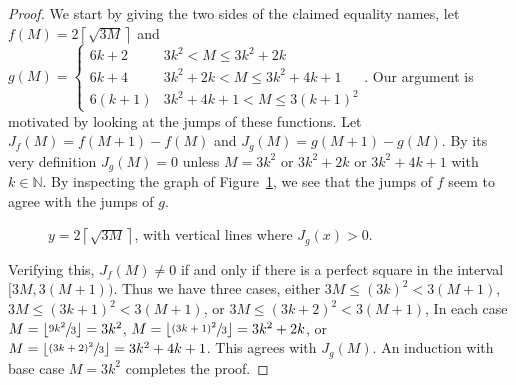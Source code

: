 \documentclass[10pt,a4paper]{amsart}
\newcommand{\David}[1]{\textcolor{red}{[David] #1}}
\newcommand{\M}{\mathcal{M}}
\newcommand{\N}{\mathbb{N}}
\newcommand{\ceil}[1]{\left\lceil #1 \right\rceil}
\newcommand{\chris}[1]{\textcolor{purple}{[Chris] #1}}
\newcommand{\floor}[1]{\left\lfloor #1 \right\rfloor}
\begin{document}
\begin{proof}
We start by giving the two sides of the claimed equality names, let $f(M)=2\ceil{\sqrt{3M}}$ and 
\\
$g(M)=\begin{cases}
    6k+2 & 3k^2<M\leq 3k^2+2k \\
    6k+4 & 3k^2+2k<M\leq 3k^2+4k+1 \\
    6(k+1) & 3k^2+4k+1<M\leq 3(k+1)^2
\end{cases}$.  Our argument is motivated by looking at the jumps of these functions. Let $J_f(M)=f(M+1)-f(M)$ and $J_g(M)=g(M+1)-g(M)$.  By its very definition $J_g(M)=0$ unless $M=3k^2$ or $3k^2+2k$ or $3k^2+4k+1$ with $k\in \N$.  By inspecting the graph of Figure~\ref{fig:graph}, we see that the jumps of $f$ seem to agree with the jumps of $g$.%


\begin{figure}[htb]
\caption{$y=2\ceil{\sqrt{3M}}$, with vertical lines where $J_g(x)>0$.}\label{fig:graph}
\end{figure}

Verifying this, $J_f(M)\neq 0$ if and only if there is a perfect square in the interval $[3M,3(M+1))$.  Thus we have three cases, either $3M\le (3k)^2<3(M+1)$, $3M\le (3k+1)^2<3(M+1)$, or $3M\le (3k+2)^2<3(M+1)$, 
In each case $M=\floor{\sfrac{9k^2}{3}} = 3k^2$, 
$M=\floor{\sfrac{(3k+1)^2}{3}}=3k^2+2k$, 
or $M=\floor{\sfrac{(3k+2)^2}{3}} =3k^2+4k+1$.  This agrees with $J_g(M)$.  An induction with base case $M=3k^2$ completes the proof.\end{proof}
\end{document}
